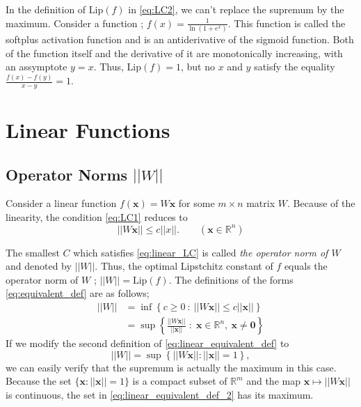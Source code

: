\documentclass[12pt]{report}
\numberwithin{figure}{chapter}
\theoremstyle{plain}
\theoremstyle{definition}
\theoremstyle{corollary}
\theoremstyle{definition}
\theoremstyle{plain}
\theoremstyle{definition}
\theoremstyle{plain}
\newcommand\bs[1]{\ensuremath{\boldsymbol{#1}}}
\newcommand\bx{\ensuremath{\boldsymbol x}}
\newcommand\lip{\ensuremath{\text{Lip}}}
\begin{document}
In the definition of \(\lip(f)\) in \eqref{eq:LC2}, we can't replace the supremum by the maximum.
Consider a function ; \(f(x)=\frac1{\ln(1+e^x)}\).
This function is called the softplus activation function and is an antiderivative of the sigmoid function.
Both of the function itself and the derivative of it are monotonically increasing, with an assymptote \(y=x\).
Thus, \(\lip(f)=1\), but no \(x\) and \(y\) satisfy the equality \(\frac{f(x)-f(y)}{x-y}=1\).

\section{Linear Functions}

%
\subsection{Operator Norms \(||W||\)}

Consider a linear function \(f(\bx)=W\bx\) for some \(m\times n\) matrix \(W\).
Because of the linearity, the condition \eqref{eq:LC1} reduces to
\begin{equation}\label{eq:linear_LC}
||W\bx||\le c||x||.\qquad(\bx\in\mathbb R^n)
\end{equation}

The smallest \(C\) which satisfies \eqref{eq:linear_LC} is called \emph{the operator norm of \(W\)} and denoted by \(||W||\).
Thus, the optimal Lipstchitz constant of \(f\) equals the operator norm of \(W\) ; \(||W||=\lip(f)\).
The definitions of the forms \eqref{eq:equivalent_def} are as follows;
\begin{equation}\label{eq:linear_equivalent_def}\begin{aligned}
||W||
&=\inf\left\{c\ge0\::\: ||W\bx||\le c||\bx||\right\}\\
&=\sup\left\{\frac{||W\bx||}{||\bx||}\;:\;\bx\in\mathbb R^n,\:\bx\neq\bs0\right\}
\end{aligned}\end{equation}
If we modify the second definition of \eqref{eq:linear_equivalent_def} to
\begin{equation}\label{eq:linear_equivalent_def_2}
||W||=\sup\left\{||W\bx||:||\bx||=1\right\},
\end{equation}
we can easily verify that the supremum is actually the maximum in this case.
Because the set \(\{\bx:||\bx||=1\}\) is a compact subset of \(\mathbb R^m\) and the map \(\bx\mapsto||W\bx||\) is continuous, the set in \eqref{eq:linear_equivalent_def_2} has its maximum.
\end{document}
